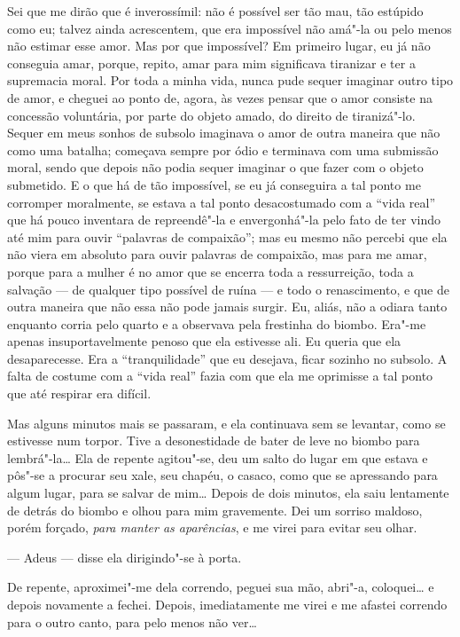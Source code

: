Sei que me dirão que é inverossímil: não é possível ser tão mau, tão
estúpido como eu; talvez ainda acrescentem, que era impossível não
amá"-la ou pelo menos não estimar esse amor. Mas por que impossível? Em
primeiro lugar, eu já não conseguia amar, porque, repito, amar para mim
significava tiranizar e ter a supremacia moral. Por toda a minha vida,
nunca pude sequer imaginar outro tipo de amor, e cheguei ao ponto de,
agora, às vezes pensar que o amor consiste na concessão voluntária, por
parte do objeto amado, do direito de tiranizá"-lo. Sequer em meus sonhos
de subsolo imaginava o amor de outra maneira que não como uma batalha;
começava sempre por ódio e terminava com uma submissão moral, sendo que
depois não podia sequer imaginar o que fazer com o objeto submetido. E
o que há de tão impossível, se eu já conseguira a tal ponto me
corromper moralmente, se estava a tal ponto desacostumado com a “vida
real” que há pouco inventara de repreendê"-la e envergonhá"-la pelo fato
de ter vindo até mim para ouvir “palavras de compaixão”; mas eu mesmo
não percebi que ela não viera em absoluto para ouvir palavras de
compaixão, mas para me amar, porque para a mulher é no amor que se
encerra toda a ressurreição, toda a salvação --- de qualquer tipo
possível de ruína --- e todo o renascimento, e que de outra maneira que
não essa não pode jamais surgir. Eu, aliás, não a odiara tanto enquanto
corria pelo quarto e a observava pela frestinha do biombo. Era"-me
apenas insuportavelmente penoso que ela estivesse ali. Eu queria que
ela desaparecesse. Era a “tranquilidade” que eu desejava, ficar sozinho
no subsolo. A falta de costume com a “vida real” fazia com que ela me
oprimisse a tal ponto que até respirar era difícil.

Mas alguns minutos mais se passaram, e ela continuava sem se levantar, como se
estivesse num torpor. Tive a desonestidade de bater de leve no biombo para
lembrá"-la\ldots{} Ela de repente agitou"-se, deu um salto do lugar em que estava
e pôs"-se a procurar seu xale, seu chapéu, o casaco, como que se apressando para
algum lugar, para se salvar de mim\ldots{} Depois de dois minutos, ela saiu
lentamente de detrás do biombo e olhou para mim gravemente. Dei um sorriso
maldoso, porém forçado, \textit{para manter as aparências}, e me virei para
evitar seu olhar.

--- Adeus --- disse ela dirigindo"-se à porta.

De repente, aproximei"-me dela correndo, peguei sua mão, abri"-a,
coloquei\ldots{} e depois novamente a fechei. Depois, imediatamente me virei
e me afastei correndo para o outro canto, para pelo menos não ver\ldots{}

